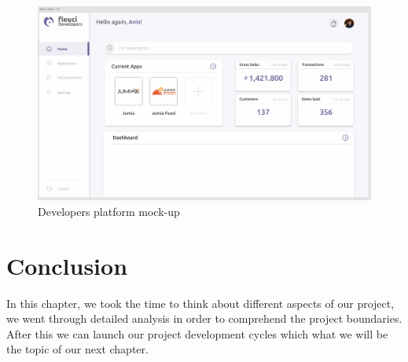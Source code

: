 \begin{spacing}{1.2}
\begin{figure}[H]\centering
\includegraphics[scale=0.4]{web_screen}
\caption{Developers platform mock-up}
\label{developersPlatform}
\end{figure}

\section*{Conclusion}
In this chapter, we took the time to think about different aspects of our project, we went through detailed analysis in order to comprehend the project boundaries. After this we can launch our project development cycles which what we will be the topic of our next chapter.
\end{spacing}
